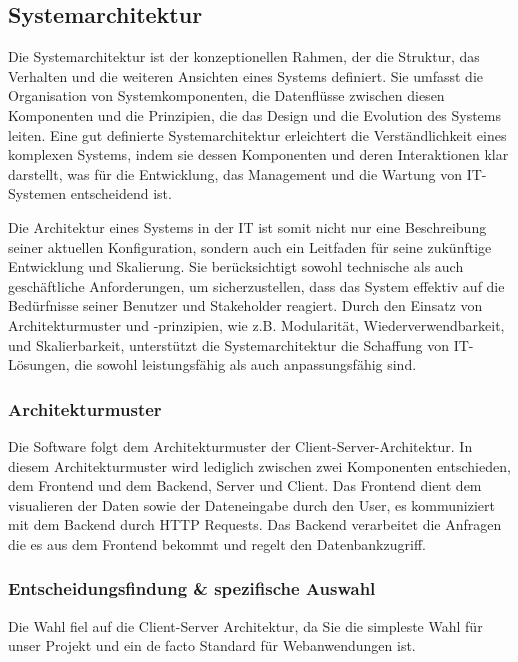 \documentclass[../main.tex]{subfiles} %
\begin{document}
\subsection{Systemarchitektur} %

Die Systemarchitektur ist der konzeptionellen Rahmen, der die Struktur, das Verhalten und die weiteren Ansichten eines Systems definiert. 
Sie umfasst die Organisation von Systemkomponenten, die Datenflüsse zwischen diesen Komponenten und die Prinzipien, die das Design und die Evolution des Systems leiten. Eine gut definierte Systemarchitektur erleichtert die Verständlichkeit eines komplexen Systems, indem sie dessen Komponenten und deren Interaktionen klar darstellt, was für die Entwicklung, das Management und die Wartung von IT-Systemen entscheidend ist.

Die Architektur eines Systems in der IT ist somit nicht nur eine Beschreibung seiner aktuellen Konfiguration, sondern auch ein Leitfaden für seine zukünftige Entwicklung und Skalierung. Sie berücksichtigt sowohl technische als auch geschäftliche Anforderungen, um sicherzustellen, dass das System effektiv auf die Bedürfnisse seiner Benutzer und Stakeholder reagiert. Durch den Einsatz von Architekturmuster und -prinzipien, wie z.B. Modularität, Wiederverwendbarkeit, und Skalierbarkeit, unterstützt die Systemarchitektur die Schaffung von IT-Lösungen, die sowohl leistungsfähig als auch anpassungsfähig sind.

\subsubsection{Architekturmuster}

Die Software folgt dem Architekturmuster der Client-Server-Architektur. In diesem Architekturmuster wird lediglich zwischen zwei Komponenten entschieden, dem Frontend und dem Backend, Server und Client.
Das Frontend dient dem visualieren der Daten sowie der Dateneingabe durch den User, es kommuniziert mit dem Backend durch HTTP Requests.
Das Backend verarbeitet die Anfragen die es aus dem Frontend bekommt und regelt den Datenbankzugriff.

\subsubsection{Entscheidungsfindung \& spezifische Auswahl}

Die Wahl fiel auf die Client-Server Architektur, da Sie die simpleste Wahl für unser Projekt und ein de facto Standard für Webanwendungen ist.
\end{document}
